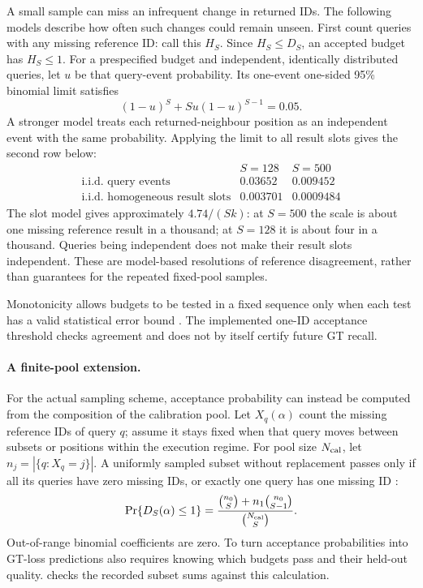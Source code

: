 A small sample can miss an infrequent change in returned IDs. The
following models describe how often such changes could remain unseen.
First count queries with any missing reference ID: call this $H_S$.
Since $H_S\leq D_S$, an accepted budget has $H_S\leq1$.
For a prespecified budget and independent, identically distributed
queries, let $u$ be that query-event probability. Its one-event
one-sided 95\% binomial limit satisfies \cite{nist_binomial}
\begin{equation}
 (1-u)^S+Su(1-u)^{S-1}=0.05.
 \label{eq:6-binomial-limit}
\end{equation}
A stronger model treats each returned-neighbour position as an
independent event with the same probability. Applying the limit to all
result slots gives the second row below:
\[
 \begin{array}{c|cc}
 &S=128&S=500\\\hline
 \text{i.i.d. query events}&0.03652&0.009452\\
 \text{i.i.d. homogeneous result slots}&0.003701&0.0009484
 \end{array}
\]
The slot model gives approximately $4.74/(Sk)$: at $S=500$ the scale is
about one missing reference result in a thousand; at $S=128$ it is about
four in a thousand. Queries being independent does not make their
result slots independent. These are model-based resolutions of reference
disagreement, rather than guarantees for the repeated fixed-pool samples.

Monotonicity allows budgets to be tested in a fixed sequence only when
each test has a valid statistical error bound \cite{learn_then_test}.
The implemented one-ID acceptance threshold checks agreement and does
not by itself certify future GT recall.

\paragraph{A finite-pool extension.}
For the actual sampling scheme, acceptance probability can instead be
computed from the composition of the calibration pool. Let
$X_q(\alpha)$ count the missing reference IDs of query $q$; assume it
stays fixed when that query moves between subsets or positions within
the execution regime. For pool size $N_{\rm cal}$, let
$n_j=|\{q:X_q=j\}|$. A uniformly sampled subset without replacement
passes only if all its queries have zero missing IDs, or exactly one
query has one missing ID \cite{nist_hypergeometric}:
\begin{equation}
 \Pr\{D_S(\alpha)\leq1\}
 =\frac{\binom{n_0}{S}+n_1\binom{n_0}{S-1}}{\binom{N_{\rm cal}}{S}}.
 \label{eq:6-finite-pool}
\end{equation}
Out-of-range binomial coefficients are zero. To turn acceptance
probabilities into GT-loss predictions also requires knowing which
budgets pass and their held-out quality. 
checks the recorded subset sums against this calculation.
